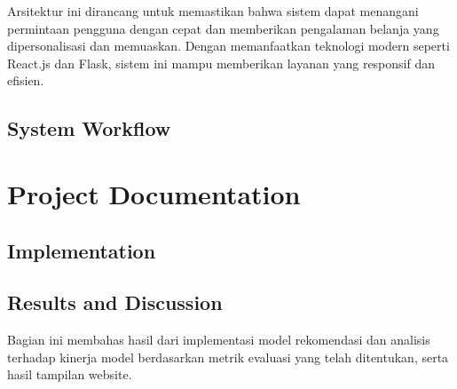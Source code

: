 \documentclass[journal,article,submit,pdftex,moreauthors]{Definitions/mdpi}
\begin{document}
Arsitektur ini dirancang untuk memastikan bahwa sistem dapat menangani permintaan pengguna dengan cepat dan memberikan pengalaman belanja yang dipersonalisasi dan memuaskan. Dengan memanfaatkan teknologi modern seperti React.js dan Flask, sistem ini mampu memberikan layanan yang responsif dan efisien.

\subsection{System Workflow}

\section{Project Documentation}
\subsection{Implementation}


\subsection{Results and Discussion}
Bagian ini membahas hasil dari implementasi model rekomendasi dan analisis terhadap kinerja model berdasarkan metrik evaluasi yang telah ditentukan, serta hasil tampilan website.
\end{document}
